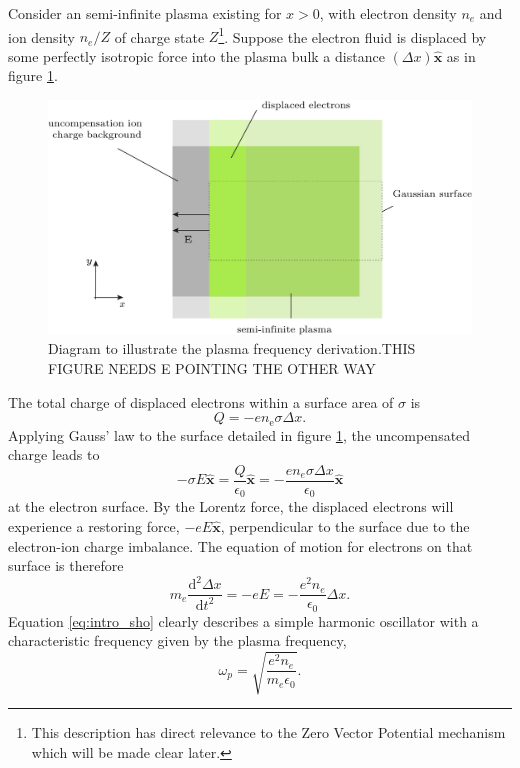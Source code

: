 Consider an semi-infinite plasma existing for $x>0$, with electron density $n_e$ and ion density $n_e/Z$ of charge state $Z$\footnote{This description has direct relevance to the Zero Vector Potential mechanism which will be made clear later.}. Suppose the electron fluid is displaced by some perfectly isotropic force into the plasma bulk a distance $(\Delta x) \hat{\mathbf{x}}$ as in figure \ref{fig:introplasmafrequency}. 
\begin{figure}
	\centering
	\includegraphics[width=0.7\linewidth]{figures/intro/intro_plasma_frequency}
	\caption{Diagram to illustrate the plasma frequency derivation.THIS FIGURE NEEDS E POINTING THE OTHER WAY}
	\label{fig:introplasmafrequency}
\end{figure}
The total charge of displaced electrons within a surface area of $\sigma$ is 
\begin{equation}\label{eq:intro_Q}
	Q = -en_\mathrm{e}\sigma\Delta x.
\end{equation}
Applying Gauss' law to the surface detailed in figure \ref{fig:introplasmafrequency}, the uncompensated charge leads to 
\begin{equation}\label{eq:intro_E}
	-\sigma E\hat{\mathbf{x}}= \frac{Q}{\epsilon_0}\hat{\mathbf{x}} = -\frac{en_e\sigma\Delta x}{\epsilon_0}\hat{\mathbf{x}}
\end{equation}
at the electron surface. By the Lorentz force, the displaced electrons will experience a restoring force, $-eE\hat{\mathbf{x}}$, perpendicular to the surface due to the electron-ion charge imbalance. The equation of motion for electrons on that surface is therefore
\begin{equation}\label{eq:intro_sho}
	m_e\frac{\mathrm{d}^2\Delta x}{\mathrm{d}t^2} = -eE = -\frac{e^2n_e}{\epsilon_0}\Delta x.
\end{equation}
Equation \ref{eq:intro_sho} clearly describes a simple harmonic oscillator with a characteristic frequency given by the plasma frequency,
\begin{equation}
	\omega_p = \sqrt{\frac{e^2n_e}{m_e \epsilon_0}}.
\end{equation}



